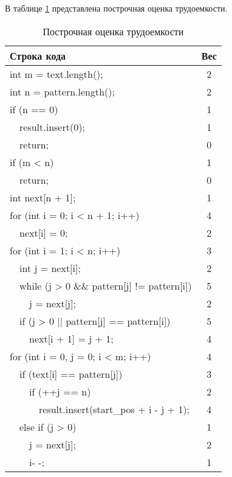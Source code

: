 В таблице \ref{tbl:kmp} представлена построчная оценка трудоемкости.
\begin{table}[H]
	\begin{center}
		\begin{threeparttable}
			\captionsetup{}
			\caption{\label{tbl:kmp}Построчная оценка трудоемкости}
			\begin{tabular}{|l|c|}
				\hline
				Строка кода & Вес \\ \hline
				int m = text.length(); & 2\\ \hline
				int n = pattern.length(); & 2\\ \hline
				if (n == 0) & 1\\ \hline
				~~result.insert(0); & 1\\ \hline
				~~return; & 0\\ \hline
				
				if (m < n) & 1\\ \hline
				~~return; & 0\\ \hline
				
				int next[n + 1];& 1\\ \hline
				for (int i = 0; i < n + 1; i++)& 4\\ \hline
				~~next[i] = 0;& 2\\ \hline
				
				for (int i = 1; i < n; i++)& 3\\ \hline
				~~int j = next[i];& 2\\ \hline
				~~while (j > 0 \&\& pattern[j] != pattern[i])& 5\\ \hline
				~~~~j = next[j];& 2\\ \hline
				~~if (j > 0 || pattern[j] == pattern[i])& 5\\ \hline
				~~~~next[i + 1] = j + 1;& 4\\ \hline
				
				for (int i = 0, j = 0; i < m; i++)& 4\\ \hline
				~~if (text[i] == pattern[j])& 3\\ \hline
				~~~~if (++j == n)& 2\\ \hline
				~~~~~~result.insert(start\_pos + i - j + 1);& 4\\ \hline
				~~else if (j > 0)& 1\\ \hline
				~~~~j = next[j];& 2\\ \hline
				~~~~i- -;& 1\\ \hline
			\end{tabular}
		\end{threeparttable}
	\end{center}
\end{table}

